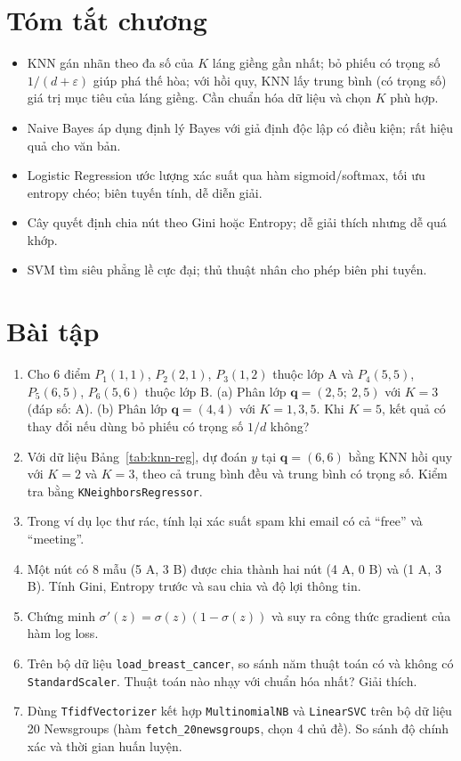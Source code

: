 \section{Tóm tắt chương}
\begin{itemize}
    \item KNN gán nhãn theo đa số của $K$ láng giềng gần nhất; bỏ phiếu có trọng số $1/(d + \varepsilon)$ giúp phá thế hòa; với hồi quy, KNN lấy trung bình (có trọng số) giá trị mục tiêu của láng giềng. Cần chuẩn hóa dữ liệu và chọn $K$ phù hợp.
    \item Naive Bayes áp dụng định lý Bayes với giả định độc lập có điều kiện; rất hiệu quả cho văn bản.
    \item Logistic Regression ước lượng xác suất qua hàm sigmoid/softmax, tối ưu entropy chéo; biên tuyến tính, dễ diễn giải.
    \item Cây quyết định chia nút theo Gini hoặc Entropy; dễ giải thích nhưng dễ quá khớp.
    \item SVM tìm siêu phẳng lề cực đại; thủ thuật nhân cho phép biên phi tuyến.
\end{itemize}

\section{Bài tập}
\begin{enumerate}
    \item Cho 6 điểm $P_1(1, 1)$, $P_2(2, 1)$, $P_3(1, 2)$ thuộc lớp A và $P_4(5, 5)$, $P_5(6, 5)$, $P_6(5, 6)$ thuộc lớp B. (a) Phân lớp $\mathbf{q} = (2{,}5;\ 2{,}5)$ với $K = 3$ (đáp số: A). (b) Phân lớp $\mathbf{q} = (4, 4)$ với $K = 1, 3, 5$. Khi $K = 5$, kết quả có thay đổi nếu dùng bỏ phiếu có trọng số $1/d$ không?
    \item Với dữ liệu Bảng~\ref{tab:knn-reg}, dự đoán $y$ tại $\mathbf{q} = (6, 6)$ bằng KNN hồi quy với $K = 2$ và $K = 3$, theo cả trung bình đều và trung bình có trọng số. Kiểm tra bằng \texttt{KNeighborsRegressor}.
    \item Trong ví dụ lọc thư rác, tính lại xác suất spam khi email có cả ``free'' và ``meeting''.
    \item Một nút có 8 mẫu (5 A, 3 B) được chia thành hai nút (4 A, 0 B) và (1 A, 3 B). Tính Gini, Entropy trước và sau chia và độ lợi thông tin.
    \item Chứng minh $\sigma'(z) = \sigma(z)(1 - \sigma(z))$ và suy ra công thức gradient của hàm log loss.
    \item Trên bộ dữ liệu \texttt{load\_breast\_cancer}, so sánh năm thuật toán có và không có \texttt{StandardScaler}. Thuật toán nào nhạy với chuẩn hóa nhất? Giải thích.
    \item Dùng \texttt{TfidfVectorizer} kết hợp \texttt{MultinomialNB} và \texttt{LinearSVC} trên bộ dữ liệu 20 Newsgroups (hàm \texttt{fetch\_20newsgroups}, chọn 4 chủ đề). So sánh độ chính xác và thời gian huấn luyện.
\end{enumerate}

